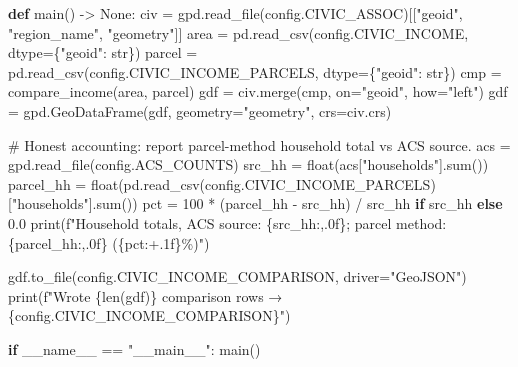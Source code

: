 \documentclass[
  letterpaper,
  DIV=11,
  numbers=noendperiod]{scrreprt}
\newenvironment{Shaded}{\begin{snugshade}}{\end{snugshade}}
\newcommand{\BuiltInTok}[1]{\textcolor[rgb]{0.00,0.23,0.31}{#1}}
\newcommand{\CommentTok}[1]{\textcolor[rgb]{0.37,0.37,0.37}{#1}}
\newcommand{\ControlFlowTok}[1]{\textcolor[rgb]{0.00,0.23,0.31}{\textbf{#1}}}
\newcommand{\DecValTok}[1]{\textcolor[rgb]{0.68,0.00,0.00}{#1}}
\newcommand{\FloatTok}[1]{\textcolor[rgb]{0.68,0.00,0.00}{#1}}
\newcommand{\KeywordTok}[1]{\textcolor[rgb]{0.00,0.23,0.31}{\textbf{#1}}}
\newcommand{\NormalTok}[1]{\textcolor[rgb]{0.00,0.23,0.31}{#1}}
\newcommand{\OperatorTok}[1]{\textcolor[rgb]{0.37,0.37,0.37}{#1}}
\newcommand{\SpecialCharTok}[1]{\textcolor[rgb]{0.37,0.37,0.37}{#1}}
\newcommand{\SpecialStringTok}[1]{\textcolor[rgb]{0.13,0.47,0.30}{#1}}
\newcommand{\StringTok}[1]{\textcolor[rgb]{0.13,0.47,0.30}{#1}}
\newcommand{\VariableTok}[1]{\textcolor[rgb]{0.07,0.07,0.07}{#1}}
\begin{document}
\begin{Shaded}
\begin{Highlighting}[]
\KeywordTok{def}\NormalTok{ main() }\OperatorTok{{-}\textgreater{}} \VariableTok{None}\NormalTok{:}
\NormalTok{    civ }\OperatorTok{=}\NormalTok{ gpd.read\_file(config.CIVIC\_ASSOC)[[}\StringTok{"geoid"}\NormalTok{, }\StringTok{"region\_name"}\NormalTok{, }\StringTok{"geometry"}\NormalTok{]]}
\NormalTok{    area }\OperatorTok{=}\NormalTok{ pd.read\_csv(config.CIVIC\_INCOME, dtype}\OperatorTok{=}\NormalTok{\{}\StringTok{"geoid"}\NormalTok{: }\BuiltInTok{str}\NormalTok{\})}
\NormalTok{    parcel }\OperatorTok{=}\NormalTok{ pd.read\_csv(config.CIVIC\_INCOME\_PARCELS, dtype}\OperatorTok{=}\NormalTok{\{}\StringTok{"geoid"}\NormalTok{: }\BuiltInTok{str}\NormalTok{\})}
    \BuiltInTok{cmp} \OperatorTok{=}\NormalTok{ compare\_income(area, parcel)}
\NormalTok{    gdf }\OperatorTok{=}\NormalTok{ civ.merge(}\BuiltInTok{cmp}\NormalTok{, on}\OperatorTok{=}\StringTok{"geoid"}\NormalTok{, how}\OperatorTok{=}\StringTok{"left"}\NormalTok{)}
\NormalTok{    gdf }\OperatorTok{=}\NormalTok{ gpd.GeoDataFrame(gdf, geometry}\OperatorTok{=}\StringTok{"geometry"}\NormalTok{, crs}\OperatorTok{=}\NormalTok{civ.crs)}

    \CommentTok{\# Honest accounting: report parcel{-}method household total vs ACS source.}
\NormalTok{    acs }\OperatorTok{=}\NormalTok{ gpd.read\_file(config.ACS\_COUNTS)}
\NormalTok{    src\_hh }\OperatorTok{=} \BuiltInTok{float}\NormalTok{(acs[}\StringTok{"households"}\NormalTok{].}\BuiltInTok{sum}\NormalTok{())}
\NormalTok{    parcel\_hh }\OperatorTok{=} \BuiltInTok{float}\NormalTok{(pd.read\_csv(config.CIVIC\_INCOME\_PARCELS)[}\StringTok{"households"}\NormalTok{].}\BuiltInTok{sum}\NormalTok{())}
\NormalTok{    pct }\OperatorTok{=} \DecValTok{100} \OperatorTok{*}\NormalTok{ (parcel\_hh }\OperatorTok{{-}}\NormalTok{ src\_hh) }\OperatorTok{/}\NormalTok{ src\_hh }\ControlFlowTok{if}\NormalTok{ src\_hh }\ControlFlowTok{else} \FloatTok{0.0}
    \BuiltInTok{print}\NormalTok{(}\SpecialStringTok{f"Household totals, ACS source: }\SpecialCharTok{\{}\NormalTok{src\_hh}\SpecialCharTok{:,.0f\}}\SpecialStringTok{; parcel method: }\SpecialCharTok{\{}\NormalTok{parcel\_hh}\SpecialCharTok{:,.0f\}}\SpecialStringTok{ (}\SpecialCharTok{\{}\NormalTok{pct}\SpecialCharTok{:+.1f\}}\SpecialStringTok{\%)"}\NormalTok{)}

\NormalTok{    gdf.to\_file(config.CIVIC\_INCOME\_COMPARISON, driver}\OperatorTok{=}\StringTok{"GeoJSON"}\NormalTok{)}
    \BuiltInTok{print}\NormalTok{(}\SpecialStringTok{f"Wrote }\SpecialCharTok{\{}\BuiltInTok{len}\NormalTok{(gdf)}\SpecialCharTok{\}}\SpecialStringTok{ comparison rows → }\SpecialCharTok{\{}\NormalTok{config}\SpecialCharTok{.}\NormalTok{CIVIC\_INCOME\_COMPARISON}\SpecialCharTok{\}}\SpecialStringTok{"}\NormalTok{)}


\ControlFlowTok{if} \VariableTok{\_\_name\_\_} \OperatorTok{==} \StringTok{"\_\_main\_\_"}\NormalTok{:}
\NormalTok{    main()}
\end{Highlighting}
\end{Shaded}
\end{document}
